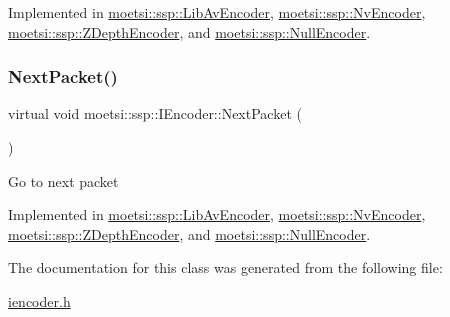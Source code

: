 Implemented in \hyperlink{classmoetsi_1_1ssp_1_1LibAvEncoder_a306c0935fa37bd35ddfeb8290289e927}{moetsi\+::ssp\+::\+Lib\+Av\+Encoder}, \hyperlink{classmoetsi_1_1ssp_1_1NvEncoder_a4c0874d9d0d767ae7a33fe9c9a1be1de}{moetsi\+::ssp\+::\+Nv\+Encoder}, \hyperlink{classmoetsi_1_1ssp_1_1ZDepthEncoder_ac11aa1369150c2aa5ffa1d70d4e6ad5d}{moetsi\+::ssp\+::\+Z\+Depth\+Encoder}, and \hyperlink{classmoetsi_1_1ssp_1_1NullEncoder_a359eb668c16a1ef7963214f7f6303af4}{moetsi\+::ssp\+::\+Null\+Encoder}.

\mbox{\label{classmoetsi_1_1ssp_1_1IEncoder_afac3ddcf2f49be16020c83cb9e0fb274}} 
\subsubsection{\texorpdfstring{Next\+Packet()}{NextPacket()}}
{\footnotesize\ttfamily virtual void moetsi\+::ssp\+::\+I\+Encoder\+::\+Next\+Packet (\begin{DoxyParamCaption}{ }\end{DoxyParamCaption})\hspace{0.3cm}{\ttfamily [pure virtual]}}

Go to next packet 

Implemented in \hyperlink{classmoetsi_1_1ssp_1_1LibAvEncoder_acf5e6e2f172d24778c7942c8cd37330b}{moetsi\+::ssp\+::\+Lib\+Av\+Encoder}, \hyperlink{classmoetsi_1_1ssp_1_1NvEncoder_a1c6d801fbb40e7dea2b33dd2ac154919}{moetsi\+::ssp\+::\+Nv\+Encoder}, \hyperlink{classmoetsi_1_1ssp_1_1ZDepthEncoder_ae3911f396fc8b86c04c94dc71e1c0672}{moetsi\+::ssp\+::\+Z\+Depth\+Encoder}, and \hyperlink{classmoetsi_1_1ssp_1_1NullEncoder_a5fe7215f2b462690208b2a144e962e14}{moetsi\+::ssp\+::\+Null\+Encoder}.



The documentation for this class was generated from the following file\+:\begin{DoxyCompactItemize}
\item 
\hyperlink{iencoder_8h}{iencoder.\+h}\end{DoxyCompactItemize}

